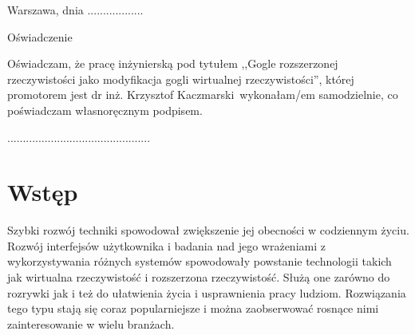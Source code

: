 \documentclass[a4paper,11pt,twoside]{report}
\theoremstyle{definition}
\newcommand{\tytul}{Gogle rozszerzonej rzeczywistości jako modyfikacja gogli wirtualnej rzeczywistości}
\renewcommand{\title}{Augmented Reality goggles as modified Virtual Reality goggles}
\newcommand{\type}{inżyniers} %
\newcommand{\supervisor}{dr inż. Krzysztof Kaczmarski}
\begin{document}
\null\thispagestyle{empty}\newpage

\null \hfill Warszawa, dnia ..................\\

\par\vspace{5cm}

\begin{center}
Oświadczenie %
\end{center}

\indent Oświadczam, że pracę \type ką pod
tytułem ,,\tytul '', której promotorem jest \supervisor \ wykonałam/em
samodzielnie, co poświadczam własnoręcznym podpisem.
\vspace{2cm}



\begin{flushright}
  \begin{minipage}{50mm}
    \begin{center}
      ..............................................

    \end{center}
  \end{minipage}
\end{flushright}

\thispagestyle{empty}
\newpage

\null\thispagestyle{empty}\newpage

\tableofcontents
\thispagestyle{empty}
\newpage
\null\thispagestyle{empty}\newpage
\setcounter{page}{11}
\pagestyle{fancy}


\chapter*{Wstęp} %

Szybki rozwój techniki spowodował zwiększenie jej obecności w codziennym życiu. Rozwój interfejsów użytkownika i badania nad jego wrażeniami z wykorzystywania różnych systemów spowodowały powstanie technologii takich jak wirtualna rzeczywistość i rozszerzona rzeczywistość. Służą one zarówno do rozrywki jak i też do ułatwienia życia i usprawnienia pracy ludziom. Rozwiązania tego typu stają się coraz popularniejsze i można zaobserwować rosnące nimi zainteresowanie w wielu branżach.
\end{document}
